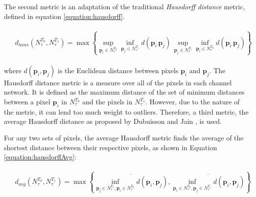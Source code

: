 
The second metric is an adaptation of the traditional \emph{Hausdorff distance} metric, defined in equation \ref{equation:hausdorff}.

\begin{align}
\begin{split}
\label{equation:hausdorff}
& d_{haus} \left( N^{T_{0}}_{\tau}, N^{T_{1}}_{\tau} \right) =  
\max \left\{ \sup_{ \textbf{p}_{i} \in N^{T_{0}}_{\tau} } \inf_{ \textbf{p}_{j} \in N^{T_{1}}_{\tau} } d\left( \textbf{p}_{i} \, \textbf{p}_{j} \right) \, \sup_{ \textbf{p}_{j} \in N^{T_{1}}_{\tau} } \inf_{ \textbf{p}_{i} \in N^{T_{0}}_{\tau} } d\left( \textbf{p}_{i} \, \textbf{p}_{j} \right) \right\}
\end{split}
\end{align}

\noindent where $d\left( \textbf{p}_{i}, \textbf{p}_{j} \right) $ is
the Euclidean distance between pixels $\textbf{p}_{i}$ and
$\textbf{p}_{j}$. The Hausdorff distance metric is a measure over all of the pixels in each channel network. It is defined as the maximum distance of the set of minimum distances between a pixel $\textbf{p}_{i}$ in $N^{T_{0}}_{\tau}$ and the pixels in $N^{T_{1}}_{\tau}$. However, due to the nature of the metric, it can lend too much weight to outliers. Therefore, a third metric, the average Hausdorff distance as proposed by Dubuisson and Jain \cite{citeulike:1146653}, is used.

For any two sets of pixels, the average Hausdorff metric finds the average of the shortest distance between their respective pixels, as shown in Equation \ref{equation:hausdorffAvg}:

\begin{align}
\label{equation:hausdorffAvg}
\begin{split}
& d_{avg} \left( N^{T_{0}}_{\tau}, N^{T_{1}}_{\tau} \right) = 
 \max\left\{ \overline{\inf_{\textbf{p}_{j} \in N^{T_{1}}_{\tau}, \textbf{p}_{i} \in N^{T_{0}}_{\tau}} d\left(\textbf{p}_{i}, \textbf{p}_{j}\right)}, \overline{\inf_{\textbf{p}_{i} \in N^{T_{0}}_{\tau}, \textbf{p}_{j} \in N^{T_{1}}_{\tau}} d\left( \textbf{p}_{i}, \textbf{p}_{j} \right)} \right\}
\end{split}
\end{align}

